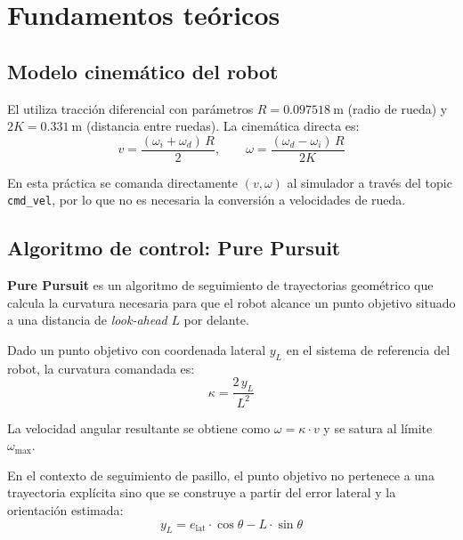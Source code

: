 \documentclass[12pt]{article}
\begin{document}
\section{Fundamentos te\'{o}ricos}

\subsection{Modelo cinem\'{a}tico del robot}
El \pioneer{} utiliza tracci\'{o}n diferencial con par\'{a}metros $R = \SI{0.097518}{\meter}$ (radio de rueda) y $2K = \SI{0.331}{\meter}$ (distancia entre ruedas). La cinem\'{a}tica directa es:
\begin{equation}
  v = \frac{(\omega_i + \omega_d)\,R}{2}, \qquad
  \omega = \frac{(\omega_d - \omega_i)\,R}{2K}
  \label{eq:cin_directa}
\end{equation}

En esta pr\'{a}ctica se comanda directamente $(v, \omega)$ al simulador a trav\'{e}s del topic \texttt{cmd\_vel}, por lo que no es necesaria la conversi\'{o}n a velocidades de rueda.

\subsection{Algoritmo de control: Pure Pursuit}
\textbf{Pure Pursuit} es un algoritmo de seguimiento de trayectorias geom\'{e}trico que calcula la curvatura necesaria para que el robot alcance un punto objetivo situado a una distancia de \emph{look-ahead} $L$ por delante.

Dado un punto objetivo con coordenada lateral $y_L$ en el sistema de referencia del robot, la curvatura comandada es:
\begin{equation}
  \kappa = \frac{2\,y_L}{L^2}
  \label{eq:pure_pursuit}
\end{equation}

La velocidad angular resultante se obtiene como $\omega = \kappa \cdot v$ y se satura al l\'{i}mite $\omega_\text{max}$.

En el contexto de seguimiento de pasillo, el punto objetivo no pertenece a una trayectoria expl\'{i}cita sino que se construye a partir del error lateral y la orientaci\'{o}n estimada:
\begin{equation}
  y_L = e_\text{lat} \cdot \cos\theta - L \cdot \sin\theta
  \label{eq:yl}
\end{equation}
\end{document}

